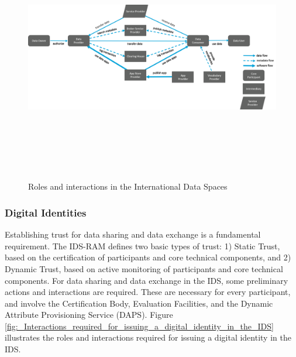 \begin{figure}[H]
	\begin{Center}
		\includegraphics[width=6.53in,height=4.32in]{./media/image18.png}
		\caption{ Roles and interactions in the International Data Spaces}
		\label{fig:_Roles_and_interactions_in_the_International_Data_Spaces}
	\end{Center}
\end{figure}






\subsubsection{Digital Identities}

Establishing trust for data sharing and data exchange is a fundamental requirement. The IDS-RAM defines two basic types of trust: 1) Static Trust, based on the certification of participants and core technical components, and 2) Dynamic Trust, based on active monitoring of participants and core technical components. For data sharing and data exchange in the IDS, some preliminary actions and interactions are required. These are necessary for every participant, and involve the Certification Body, Evaluation Facilities, and the Dynamic Attribute Provisioning Service (DAPS). Figure \ref{fig:_Interactions_required_for_issuing_a_digital_identity_in_the_IDS} illustrates the roles and interactions required for issuing a digital identity in the IDS.  


